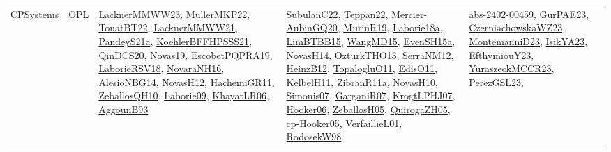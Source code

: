 {\begin{longtable}{lp{3cm}>{\raggedright}p{6cm}>{\raggedright}p{6cm}p{8cm}}
CPSystems & OPL & \href{articles/LacknerMMWW23.pdf}{LacknerMMWW23}\cite{LacknerMMWW23}, \href{articles/MullerMKP22.pdf}{MullerMKP22}\cite{MullerMKP22}, \href{papers/TouatBT22.pdf}{TouatBT22}\cite{TouatBT22}, \href{papers/LacknerMMWW21.pdf}{LacknerMMWW21}\cite{LacknerMMWW21}, \href{articles/PandeyS21a.pdf}{PandeyS21a}\cite{PandeyS21a}, \href{articles/KoehlerBFFHPSSS21.pdf}{KoehlerBFFHPSSS21}\cite{KoehlerBFFHPSSS21}, \href{articles/QinDCS20.pdf}{QinDCS20}\cite{QinDCS20}, \href{articles/Novas19.pdf}{Novas19}\cite{Novas19}, \href{articles/EscobetPQPRA19.pdf}{EscobetPQPRA19}\cite{EscobetPQPRA19}, \href{articles/LaborieRSV18.pdf}{LaborieRSV18}\cite{LaborieRSV18}, \href{articles/NovaraNH16.pdf}{NovaraNH16}\cite{NovaraNH16}, \href{papers/AlesioNBG14.pdf}{AlesioNBG14}\cite{AlesioNBG14}, \href{articles/NovasH12.pdf}{NovasH12}\cite{NovasH12}, \href{articles/HachemiGR11.pdf}{HachemiGR11}\cite{HachemiGR11}, \href{articles/ZeballosQH10.pdf}{ZeballosQH10}\cite{ZeballosQH10}, \href{papers/Laborie09.pdf}{Laborie09}\cite{Laborie09}, \href{articles/KhayatLR06.pdf}{KhayatLR06}\cite{KhayatLR06}, \href{articles/AggounB93.pdf}{AggounB93}\cite{AggounB93} & \href{articles/SubulanC22.pdf}{SubulanC22}\cite{SubulanC22}, \href{papers/Teppan22.pdf}{Teppan22}\cite{Teppan22}, \href{papers/Mercier-AubinGQ20.pdf}{Mercier-AubinGQ20}\cite{Mercier-AubinGQ20}, \href{papers/MurinR19.pdf}{MurinR19}\cite{MurinR19}, \href{papers/Laborie18a.pdf}{Laborie18a}\cite{Laborie18a}, \href{papers/LimBTBB15.pdf}{LimBTBB15}\cite{LimBTBB15}, \href{articles/WangMD15.pdf}{WangMD15}\cite{WangMD15}, \href{articles/EvenSH15a.pdf}{EvenSH15a}\cite{EvenSH15a}, \href{articles/NovasH14.pdf}{NovasH14}\cite{NovasH14}, \href{articles/OzturkTHO13.pdf}{OzturkTHO13}\cite{OzturkTHO13}, \href{papers/SerraNM12.pdf}{SerraNM12}\cite{SerraNM12}, \href{papers/HeinzB12.pdf}{HeinzB12}\cite{HeinzB12}, \href{articles/TopalogluO11.pdf}{TopalogluO11}\cite{TopalogluO11}, \href{papers/EdisO11.pdf}{EdisO11}\cite{EdisO11}, \href{articles/KelbelH11.pdf}{KelbelH11}\cite{KelbelH11}, \href{papers/ZibranR11a.pdf}{ZibranR11a}\cite{ZibranR11a}, \href{articles/NovasH10.pdf}{NovasH10}\cite{NovasH10}, \href{articles/Simonis07.pdf}{Simonis07}\cite{Simonis07}, \href{papers/GarganiR07.pdf}{GarganiR07}\cite{GarganiR07}, \href{papers/KrogtLPHJ07.pdf}{KrogtLPHJ07}\cite{KrogtLPHJ07}, \href{articles/Hooker06.pdf}{Hooker06}\cite{Hooker06}, \href{articles/ZeballosH05.pdf}{ZeballosH05}\cite{ZeballosH05}, \href{papers/QuirogaZH05.pdf}{QuirogaZH05}\cite{QuirogaZH05}, \href{papers/cp-Hooker05.pdf}{cp-Hooker05}\cite{cp-Hooker05}, \href{papers/VerfaillieL01.pdf}{VerfaillieL01}\cite{VerfaillieL01}, \href{papers/RodosekW98.pdf}{RodosekW98}\cite{RodosekW98} & \href{articles/abs-2402-00459.pdf}{abs-2402-00459}\cite{abs-2402-00459}, \href{articles/GurPAE23.pdf}{GurPAE23}\cite{GurPAE23}, \href{articles/CzerniachowskaWZ23.pdf}{CzerniachowskaWZ23}\cite{CzerniachowskaWZ23}, \href{articles/MontemanniD23.pdf}{MontemanniD23}\cite{MontemanniD23}, \href{articles/IsikYA23.pdf}{IsikYA23}\cite{IsikYA23}, \href{papers/EfthymiouY23.pdf}{EfthymiouY23}\cite{EfthymiouY23}, \href{articles/YuraszeckMCCR23.pdf}{YuraszeckMCCR23}\cite{YuraszeckMCCR23}, \href{papers/PerezGSL23.pdf}{PerezGSL23}\cite{PerezGSL23}, 
\end{longtable}}

